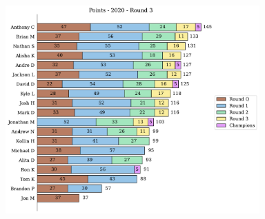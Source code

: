 \documentclass[10pt]{article}
\begin{document}
%
\begin{minipage}[t]{13cm}
    \vspace{0pt}
    \begin{figure}[H]
        \vspace{-1cm}
        \includegraphics[width=12cm,height=8cm,keepaspectratio]{../../figures/2020/Points-2020-Round3.pdf}
    \end{figure}
\end{minipage}
\end{document}

